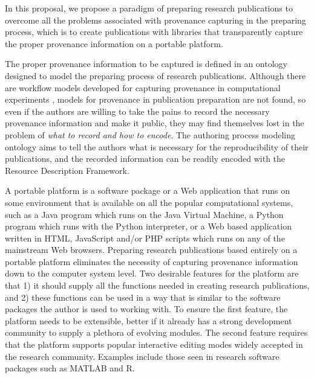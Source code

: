 In this proposal, we propose a paradigm of preparing research publications to overcome all the problems associated with provenance capturing in the preparing process, which is to create publications with libraries that transparently capture the proper provenance information on a portable platform.



The proper provenance information to be captured is defined in an ontology designed to model the preparing process of research publications. Although there are workflow models developed for capturing provenance in computational experiments \cite{groth2006architecture, groth2009recording}, models for provenance in publication preparation are not found, so even if the authors are willing to take the pains to record the necessary provenance information and make it public, they may find themselves lost in the problem of \emph{what to record and how to encode}. The authoring process modeling ontology aims to tell the authors what is necessary for the reproducibility of their publications, and the recorded information can be readily encoded with the Resource Description Framework.

A portable platform is a software package or a Web application that runs on some environment that is available on all the popular computational systems, such as a Java program which runs on the Java Virtual Machine, a Python program which runs with the Python interpreter, or a Web based application written in HTML, JavaScript and/or PHP scripts which runs on any of the mainstream Web browsers. Preparing research publications based entirely on a portable platform eliminates the necessity of capturing provenance information down to the computer system level. Two desirable features for the platform are that 1) it should supply all the functions needed in creating research publications, and 2) these functions can be used in a way that is similar to the software packages the author is used to working with. To ensure the first feature, the platform needs to be extensible, better if it already has a strong development community to supply a plethora of evolving modules. The second feature requires that the platform supports popular interactive editing modes widely accepted in the research community. Examples include those seen in research software packages such as MATLAB and R.

